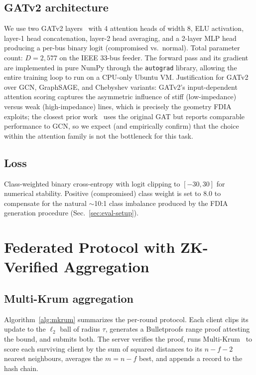 \documentclass[conference]{IEEEtran}
\begin{document}
\subsection{GATv2 architecture}
We use two GATv2 layers~\cite{brody2022gatv2} with 4 attention heads of width 8, ELU activation, layer-1 head concatenation, layer-2 head averaging, and a 2-layer MLP head producing a per-bus binary logit (compromised vs.\ normal). Total parameter count: $D=2{,}577$ on the IEEE 33-bus feeder. The forward pass and its gradient are implemented in pure NumPy through the \texttt{autograd} library, allowing the entire training loop to run on a CPU-only Ubuntu VM. Justification for GATv2 over GCN, GraphSAGE, and Chebyshev variants: GATv2's input-dependent attention scoring captures the asymmetric influence of stiff (low-impedance) versus weak (high-impedance) lines, which is precisely the geometry FDIA exploits; the closest prior work~\cite{boyaci2022gnn} uses the original GAT but reports comparable performance to GCN, so we expect (and empirically confirm) that the choice within the attention family is not the bottleneck for this task.

\subsection{Loss}
Class-weighted binary cross-entropy with logit clipping to $[-30, 30]$ for numerical stability. Positive (compromised) class weight is set to $8.0$ to compensate for the natural $\sim$10:1 class imbalance produced by the FDIA generation procedure (Sec.~\ref{sec:eval-setup}).

\section{Federated Protocol with ZK-Verified Aggregation}
\label{sec:fl}
\subsection{Multi-Krum aggregation}
Algorithm~\ref{alg:mkrum} summarizes the per-round protocol. Each client clips its update to the $\ell_2$ ball of radius $\tau$, generates a Bulletproofs range proof attesting the bound, and submits both. The server verifies the proof, runs Multi-Krum~\cite{blanchard2017krum} to score each surviving client by the sum of squared distances to its $n-f-2$ nearest neighbours, averages the $m=n-f$ best, and appends a record to the hash chain.
\end{document}
